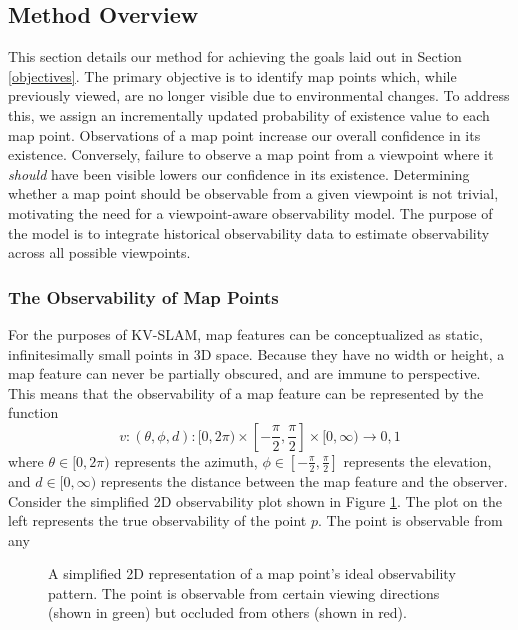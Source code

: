 \subsection{Method Overview}

This section details our method for achieving the goals laid out in Section \ref{objectives}. The primary objective is to identify map points which, while previously viewed, are no longer visible due to environmental changes. To address this, we assign an incrementally updated probability of existence value to each map point. Observations of a map point increase our overall confidence in its existence. Conversely, failure to observe a map point from a viewpoint where it \textit{should} have been visible lowers our confidence in its existence. Determining whether a map point should be observable from a given viewpoint is not trivial, motivating the need for a viewpoint-aware observability model. The purpose of the model is to integrate historical observability data to estimate observability across all possible viewpoints.

\subsubsection{The Observability of Map Points}

For the purposes of KV-SLAM, map features can be conceptualized as static, infinitesimally small points in 3D space. Because they have no width or height, a map feature can never be partially obscured, and are immune to perspective. This means that the observability of a map feature can be represented by the function
$$
    v:(\theta,\phi,d):[0,2\pi)\times\left[-\frac{\pi}{2},\frac{\pi}{2}\right]\times[0,\infty)\to{0,1}
$$
where $\theta\in[0,2\pi)$ represents the azimuth, $\phi\in\left[-\frac{\pi}{2},\frac{\pi}{2}\right]$ represents the elevation, and $d\in[0,\infty)$ represents the distance between the map feature and the observer. Consider the simplified 2D observability plot shown in Figure \ref{fig:2d_observability}. The plot on the left represents the true observability of the point $p$. The point is observable from any 

\begin{figure}[!ht]
    \centering
    \caption{A simplified 2D representation of a map point's ideal observability pattern. The point is observable from certain viewing directions (shown in green) but occluded from others (shown in red).}
    \label{fig:2d_observability}
\end{figure}

